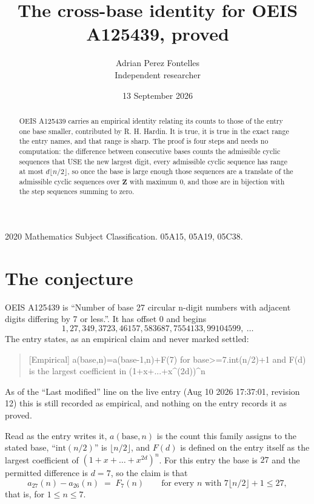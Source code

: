 \documentclass[11pt,a4paper]{article}
\title{The cross-base identity for OEIS A125439, proved}
\author{Adrian Perez Fontelles\\ \small Independent researcher}
\date{13 September 2026}
\theoremstyle{plain}
\theoremstyle{definition}
\begin{document}
\maketitle

\begin{abstract}
OEIS A125439 carries an empirical identity relating its counts to those of the entry one base
smaller, contributed by R. H. Hardin. It is true, it is true in the exact range the entry
names, and that range is sharp. The proof is four steps and needs no computation: the
difference between consecutive bases counts the admissible cyclic sequences that USE the new
largest digit, every admissible cyclic sequence has range at most $d\lfloor n/2\rfloor$, so
once the base is large enough those sequences are a translate of the admissible cyclic
sequences over $\mathbf{Z}$ with maximum $0$, and those are in bijection with the step
sequences summing to zero.
\end{abstract}

\noindent\small 2020 Mathematics Subject Classification. 05A15, 05A19, 05C38.\normalsize

\section{The conjecture}

OEIS A125439 is ``Number of base 27 circular n-digit numbers with adjacent digits differing by 7 or less.''. It has offset $0$ and begins
\[
1, 27, 349, 3723, 46157, 583687, 7554133, 99104599,\ \dots
\]
The entry states, as an empirical claim and never marked settled:
\begin{quote}
[Empirical] a(base,n)=a(base-1,n)+F(7) for base>=7.int(n/2)+1 and F(d) is the largest coefficient in (1+x+...+x\textasciicircum{}(2d))\textasciicircum{}n
\end{quote}
As of the ``Last modified'' line on the live entry (Aug 10 2026 17:37:01, revision 12)
this is still recorded as empirical, and nothing on the entry records it as proved.

Read as the entry writes it, $a(\mathrm{base},n)$ is the count this family assigns to the
stated base, ``$\mathrm{int}(n/2)$'' is $\lfloor n/2\rfloor$, and $F(d)$ is defined on the
entry itself as the largest coefficient of $(1+x+\dots+x^{2d})^{n}$. For this entry
the base is $27$ and the permitted difference is $d=7$, so the claim is that
\[
a_{27}(n)-a_{26}(n)\;=\;F_{7}(n)
\qquad\text{for every } n \text{ with } 7\lfloor n/2\rfloor+1\le27,
\]
that is, for $1\le n\le7$.
\end{document}
